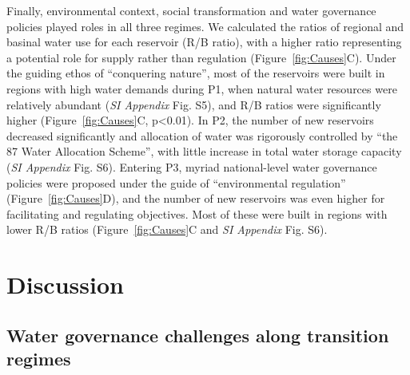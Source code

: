 \documentclass[9pt, twocolumn, twoside, lineno]{pnas-new}
\begin{document}
Finally, environmental context, social transformation and water governance policies played roles in all three regimes. 
We calculated the ratios of regional and basinal water use for each reservoir (R/B ratio), with a higher ratio representing a potential role for supply rather than regulation (Figure~\ref{fig:Causes}C).
Under the guiding ethos of ``conquering nature'', most of the reservoirs were built in regions with high water demands during P1, when natural water resources were relatively abundant (\textit{SI Appendix} Fig. S5), and R/B ratios were significantly higher (Figure~\ref{fig:Causes}C, p<0.01). 
In P2, the number of new reservoirs decreased significantly and allocation of water was rigorously controlled by ``the 87 Water Allocation Scheme'', with little increase in total water storage capacity (\textit{SI Appendix} Fig. S6). 
Entering P3, myriad national-level water governance policies were proposed under the guide of ``environmental regulation'' (Figure~\ref{fig:Causes}D), and the number of new reservoirs was even higher for facilitating and regulating objectives. Most of these were built in regions with lower R/B ratios (Figure~\ref{fig:Causes}C and \textit{SI Appendix} Fig. S6).


\section*{Discussion}
\label{Discussion}

\subsection*{Water governance challenges along transition regimes}
\end{document}
